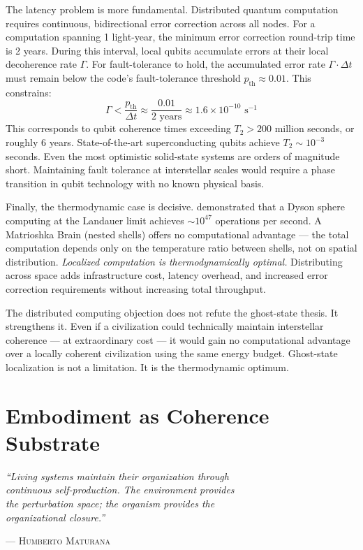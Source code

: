 \documentclass[12pt, a4paper]{article}
\begin{document}
The latency problem is more fundamental. Distributed quantum computation requires continuous,
bidirectional error correction across all nodes. For a computation spanning 1 light-year, the
minimum error correction round-trip time is 2 years. During this interval, local qubits
accumulate errors at their local decoherence rate $\Gamma$. For fault-tolerance to hold, the
accumulated error rate $\Gamma \cdot \Delta t$ must remain below the code's fault-tolerance
threshold $p_{\mathrm{th}} \approx 0.01$. This constrains:
\[
\Gamma < \frac{p_{\mathrm{th}}}{\Delta t} \approx \frac{0.01}{2 \text{ years}} \approx
1.6 \times 10^{-10} \text{ s}^{-1}
\]
This corresponds to qubit coherence times exceeding $T_2 > 200$ million seconds, or roughly
6 years. State-of-the-art superconducting qubits achieve $T_2 \sim 10^{-3}$ seconds. Even
the most optimistic solid-state systems are orders of magnitude short. Maintaining fault
tolerance at interstellar scales would require a phase transition in qubit technology with no
known physical basis.

Finally, the thermodynamic case is decisive. \citet{wright2023} demonstrated that
a Dyson sphere computing at the Landauer limit achieves $\sim 10^{47}$ operations per second.
A Matrioshka Brain (nested shells) offers no computational advantage --- the total
computation depends only on the temperature ratio between shells, not on spatial
distribution. \textit{Localized computation is thermodynamically optimal.} Distributing
across space adds infrastructure cost, latency overhead, and increased error correction
requirements without increasing total throughput.

The distributed computing objection does not refute the ghost-state thesis. It strengthens
it. Even if a civilization could technically maintain interstellar coherence --- at
extraordinary cost --- it would gain no computational advantage over a locally coherent
civilization using the same energy budget. Ghost-state localization is not a limitation. It
is the thermodynamic optimum.

\section{Embodiment as Coherence Substrate}

\epigraph{
  \textit{``Living systems maintain their organization through\\
  continuous self-production. The environment provides\\
  the perturbation space; the organism provides the\\
  organizational closure.''}
}{--- \textsc{Humberto Maturana}}
\end{document}

